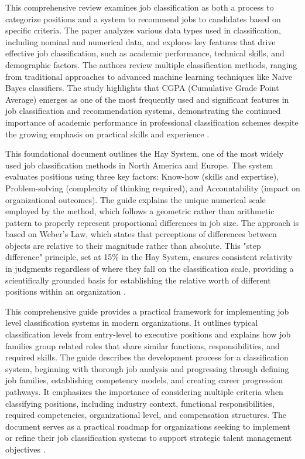 \documentclass[../main.tex]{subfiles}
\begin{document}
This comprehensive review examines job classification as both a process to categorize positions and a system to recommend jobs to candidates based on specific criteria. The paper analyzes various data types used in classification, including nominal and numerical data, and explores key features that drive effective job classification, such as academic performance, technical skills, and demographic factors. The authors review multiple classification methods, ranging from traditional approaches to advanced machine learning techniques like Naive Bayes classifiers. The study highlights that CGPA (Cumulative Grade Point Average) emerges as one of the most frequently used and significant features in job classification and recommendation systems, demonstrating the continued importance of academic performance in professional classification schemes despite the growing emphasis on practical skills and experience \parencite{jeesr2021}.

This foundational document outlines the Hay System, one of the most widely used job classification methods in North America and Europe. The system evaluates positions using three key factors: Know-how (skills and expertise), Problem-solving (complexity of thinking required), and Accountability (impact on organizational outcomes). The guide explains the unique numerical scale employed by the method, which follows a geometric rather than arithmetic pattern to properly represent proportional differences in job size. The approach is based on Weber's Law, which states that perceptions of differences between objects are relative to their magnitude rather than absolute. This "step difference" principle, set at 15\% in the Hay System, ensures consistent relativity in judgments regardless of where they fall on the classification scale, providing a scientifically grounded basis for establishing the relative worth of different positions within an organization \parencite{haygroup2024}.

This comprehensive guide provides a practical framework for implementing job level classification systems in modern organizations. It outlines typical classification levels from entry-level to executive positions and explains how job families group related roles that share similar functions, responsibilities, and required skills. The guide describes the development process for a classification system, beginning with thorough job analysis and progressing through defining job families, establishing competency models, and creating career progression pathways. It emphasizes the importance of considering multiple criteria when classifying positions, including industry context, functional responsibilities, required competencies, organizational level, and compensation structures. The document serves as a practical roadmap for organizations seeking to implement or refine their job classification systems to support strategic talent management objectives \parencite{deel2024}.
\end{document}
